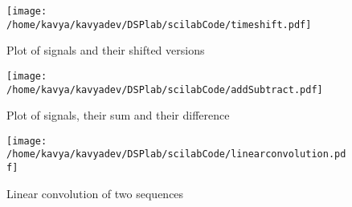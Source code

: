 \begin{figure}
\texttt{[image: /home/kavya/kavyadev/DSPlab/scilabCode/timeshift.pdf]}
\caption{Plot of signals and their shifted versions}
\label{shifted}
\end{figure}


\begin{figure}
\texttt{[image: /home/kavya/kavyadev/DSPlab/scilabCode/addSubtract.pdf]}
\caption{Plot of signals, their sum and their difference}
\label{addSub}
\end{figure}

\begin{figure}
\texttt{[image: /home/kavya/kavyadev/DSPlab/scilabCode/linearconvolution.pdf]}
\caption{Linear convolution of two sequences}
\label{linconv}
\end{figure}


